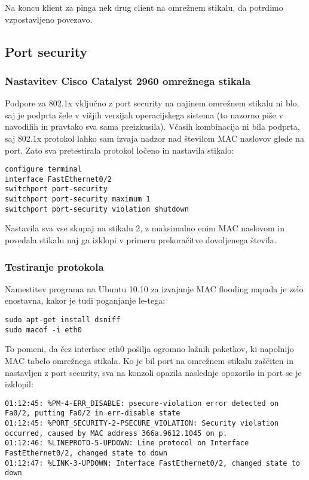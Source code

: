 \documentclass[12pt]{article}
\begin{document}
Na koncu klient za pinga nek drug client na omrežnem stikalu, da potrdimo vzpostavljeno povezavo.


\subsection{Port security}

\subsubsection{Nastavitev Cisco Catalyst 2960 omrežnega stikala}

Podpore za 802.1x vključno z port security na najinem omrežnem stikalu ni blo, saj je podprta šele v višjih verzijah operacijskega sistema (to nazorno piše v navodilih in pravtako sva sama preizkusila). Včasih kombinacija ni bila podprta, saj 802.1x protokol lahko sam izvaja nadzor nad številom MAC naslovov glede na port. Zato sva pretestirala protokol ločeno in nastavila stikalo:

\begin{verbatim}
configure terminal
interface FastEthernet0/2
switchport port-security
switchport port-security maximum 1
switchport port-security violation shutdown
\end{verbatim}

Nastavila sva vse skupaj na stikalu 2, z maksimalno enim MAC naslovom in povedala stikalu naj ga izklopi v primeru prekoračitve dovoljenega števila.

\subsubsection{Testiranje protokola}

Namestitev programa na Ubuntu 10.10 za izvajanje MAC flooding napada je zelo enostavna, kakor je tudi poganjanje le-tega:
 
\begin{verbatim}
sudo apt-get install dsniff
sudo macof -i eth0
\end{verbatim}

To pomeni, da čez interface eth0 pošilja ogromno lažnih paketkov, ki napolnijo MAC tabelo omrežnega stikala. Ko je bil port na omrežnem stikalu zaščiten in nastavljen z port security, sva na konzoli opazila naslednje opozorilo in port se je izklopil:

\begin{verbatim}
01:12:45: %PM-4-ERR_DISABLE: psecure-violation error detected on Fa0/2, putting Fa0/2 in err-disable state
01:12:45: %PORT_SECURITY-2-PSECURE_VIOLATION: Security violation occurred, caused by MAC address 366a.9612.1045 on p.
01:12:46: %LINEPROTO-5-UPDOWN: Line protocol on Interface FastEthernet0/2, changed state to down
01:12:47: %LINK-3-UPDOWN: Interface FastEthernet0/2, changed state to down
\end{verbatim}
\end{document}

